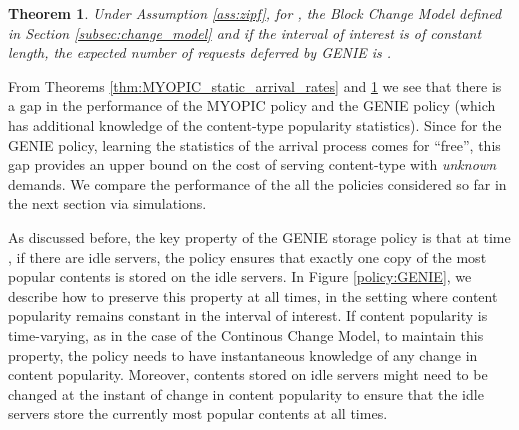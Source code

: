\documentclass[10pt, conference, letterpaper]{IEEEtran}
\newtheorem{theorem}{Theorem}
\begin{document}
\begin{theorem}
	\label{thm:GENIE_static_arrival_rates}
	Under Assumption \ref{ass:zipf}, for , the Block Change Model defined in Section \ref{subsec:change_model} and if the interval
	of interest is of constant length, the expected number of requests
	deferred by GENIE is .
\end{theorem}

From Theorems \ref{thm:MYOPIC_static_arrival_rates} and
\ref{thm:GENIE_static_arrival_rates} we see that there is a gap in the
performance of the MYOPIC policy and the GENIE policy (which has
additional knowledge of the content-type popularity statistics). Since
for the GENIE policy, learning the statistics of the arrival process
comes for ``free'', this gap provides an upper bound on the cost of
serving content-type with \emph{unknown} demands. We compare the
performance of the all the policies considered so far in the next
section via simulations.



As discussed before, the key property of the GENIE storage policy is that at time , if there are  idle servers, the policy ensures that exactly one copy of the  most popular contents is stored on the idle servers. In Figure \ref{policy:GENIE}, we describe how to preserve this property at all times, in the setting where content popularity remains constant in the interval of interest.  If content popularity is time-varying, as in the case of the Continous Change Model, to maintain this property, the policy needs to have instantaneous knowledge of any change in content popularity. Moreover, contents stored on idle servers might need to be changed at the instant of change in content popularity to ensure that the idle servers store the currently most popular contents at all times.
\end{document}
